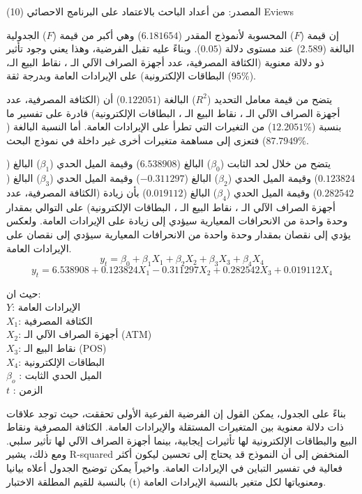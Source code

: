 \documentclass[10pt,a4paper]{report}
\begin{document}
\begin{doublespacing}
المصدر: من أعداد الباحث بالاعتماد على البرنامج الاحصائي (10) Eviews

إن قيمة ($F$) المحسوبة لأنموذج المقدر ($6.181654$) وهي أكبر من قيمة ($F$) الجدولية البالغة ($2.589$) عند مستوى دلالة ($0.05$). وبناءً عليه تقبل الفرضية، وهذا يعني وجود تأثير ذو دلالة معنوية (الكثافة المصرفية، عدد أجهزة الصراف الآلي الـ ، نقاط البيع الـ، البطاقات الإلكترونية) على الإيرادات العامة وبدرجة ثقة ($95\%$).

يتضح من قيمة معامل التحديد ($R^2$) البالغة ($0.122051$) أن (الكثافة المصرفية، عدد أجهزة الصراف الآلي الـ ، نقاط البيع الـ ، البطاقات الإلكترونية) قادرة على تفسير ما بنسبة ($12.2051\%$) من التغيرات التي تطرأ على الإيرادات العامة. أما النسبة البالغة ($87.7949\%$) فتعزى إلى مساهمة متغيرات أخرى غير داخلة في نموذج البحث.

{يتضح من خلال لحد الثابت} ($\beta_0$) {البالغ} ($6.538908$) {وقيمة الميل الحدي} ($\beta_1$) {البالغ} ($0.123824$) {وقيمة الميل الحدي} ($\beta_2$) {البالغ} ($-0.311297$) {وقيمة الميل الحدي} ($\beta_3$) {البالغ} ($0.282542$) {وقيمة الميل الحدي} ($\beta_4$) {البالغ} ($0.019112$) 
{بأن زيادة} (الكثافة المصرفية، عدد أجهزة الصراف الآلي الـ ، نقاط البيع الـ ، البطاقات الإلكترونية) {على التوالي بمقدار وحدة واحدة من الانحرافات المعيارية سيؤدي إلى زيادة على الإيرادات العامة. ولعكس يؤدي إلى نقصان بمقدار وحدة واحدة من الانحرافات المعيارية سيؤدي إلى نقصان على الإيرادات العامة.}
\begin{equation}
	y_t=\beta_0+\beta_1X_1+\beta_2X_2+\beta_3X_3+\beta_4X_4
\end{equation}
\[
    y_t = 6.538908 + 0.123824 X_1 - 0.311297 X_2 + 0.282542 X_3 + 0.019112 X_4
\]

حيث ان:\\
$Y$: الإيرادات العامة \\
$X_1$: الكثافة المصرفية \\
$X_2$:  أجهزة الصراف الآلي الـ (ATM)\\
$X_3$: نقاط البيع الـ (POS)\\
$X_4$: البطاقات الإلكترونية\\
$\beta_o$ : الميل الحدي الثابت\\
$t$ : الزمن 

بناءً على الجدول، يمكن القول إن الفرضية الفرعية الأولى تحققت، حيث توجد علاقات ذات دلالة معنوية بين المتغيرات المستقلة والإيرادات العامة. الكثافة المصرفية ونقاط البيع والبطاقات الإلكترونية لها تأثيرات إيجابية، بينما أجهزة الصراف الآلي لها تأثير سلبي. ومع ذلك، يشير R-squared المنخفض إلى أن النموذج قد يحتاج إلى تحسين ليكون أكثر فعالية في تفسير التباين في الإيرادات العامة. واخيراً يمكن توضيح الجدول أعلاه بيانيا بالنسبة للقيم المطلقة الاختبار (t) ومعنوياتها لكل متغير بالنسبة الإيرادات العامة.


\end{doublespacing}
\end{document}
